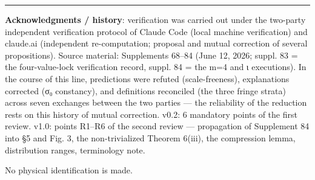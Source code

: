\documentclass[
]{article}
\begin{document}
\begin{center}\rule{0.5\linewidth}{0.5pt}\end{center}

\textbf{Acknowledgments / history}: verification was carried out under
the two-party independent verification protocol of Claude Code (local
machine verification) and claude.ai (independent re-computation;
proposal and mutual correction of several propositions). Source
material: Supplements 68--84 (June 12, 2026; suppl. 83 = the
four-value-lock verification record, suppl. 84 = the m=4 and ι
executions). In the course of this line, predictions were refuted
(scale-freeness), explanations corrected (σ₀ constancy), and definitions
reconciled (the three fringe strata) across seven exchanges between the
two parties --- the reliability of the reduction rests on this history
of mutual correction. v0.2: 6 mandatory points of the first review.
v1.0: points R1--R6 of the second review --- propagation of Supplement
84 into §5 and Fig. 3, the non-trivialized Theorem 6(iii), the
compression lemma, distribution ranges, terminology note.

No physical identification is made.
\end{document}
